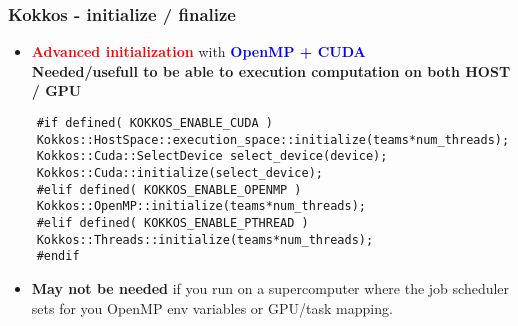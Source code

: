 \begin{frame}[fragile=singleslide]
  \frametitle{Kokkos - initialize / finalize}

  \begin{itemize}
  \item \textcolor{red}{\textbf{Advanced initialization}} with \textcolor{blue}{\textbf{OpenMP + CUDA}}\\
    \textbf{Needed/usefull to be able to execution computation on both HOST / GPU}
  \end{itemize}
  \begin{verbatim}
    #if defined( KOKKOS_ENABLE_CUDA )
    Kokkos::HostSpace::execution_space::initialize(teams*num_threads);
    Kokkos::Cuda::SelectDevice select_device(device);
    Kokkos::Cuda::initialize(select_device);
    #elif defined( KOKKOS_ENABLE_OPENMP )
    Kokkos::OpenMP::initialize(teams*num_threads);
    #elif defined( KOKKOS_ENABLE_PTHREAD )
    Kokkos::Threads::initialize(teams*num_threads);
    #endif
  \end{verbatim}
  \begin{itemize}
  \item {\bf May not be needed} if you run on a supercomputer where the job scheduler sets for you OpenMP env variables or GPU/task mapping.
  \end{itemize}
\end{frame}


